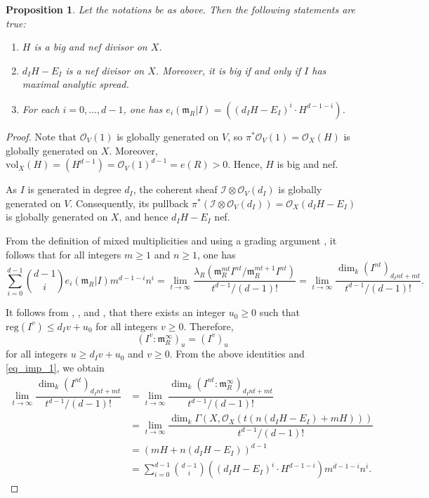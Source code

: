 \documentclass[12pt,a4paper]{amsart}
\theoremstyle{plain}
\newtheorem{proposition}[theorem]{Proposition}
\theoremstyle{definition}
\numberwithin{equation}{theorem}
\begin{document}
\begin{proposition}\label{prop_intersect}
Let the notations be as above. Then the following statements are true:
\begin{enumerate}
 \item[$(i)$] $H$ is a big and nef divisor on $X$.
 \item[$(ii)$] $d_IH-E_I$ is a nef divisor on $X$. Moreover, it is big if and only if $I$ has maximal analytic spread.
 \item[$(iii)$] For each $i=0,\ldots,d-1$, one has $e_i\left(\mathfrak{m}_R \vert I\right) = \left((d_IH-E_I)^{i}\cdot H^{d-1-i}\right)$.
\end{enumerate}
\end{proposition}
\begin{proof}
Note that $\mathcal{O}_V(1)$ is globally generated on $V$, so $\pi^* \mathcal{O}_V(1) = \mathcal{O}_X(H)$ is globally generated on $X$. Moreover, $\mathrm{vol}_X(H) = (H^{d-1}) = {\mathcal{O}_V(1)}^{d-1} = e(R)>0$. Hence, $H$ is big and nef.

As $I$ is generated in degree $d_I$, the coherent sheaf $\mathcal{I}\otimes \mathcal{O}_V(d_I)$ is globally generated on $V$. Consequently, its pullback $\pi^*\left(\mathcal{I}\otimes \mathcal{O}_V(d_I)\right) = \mathcal{O}_X(d_IH-E_I)$ is globally generated on $X$, and hence $d_IH-E_I$ nef.

From the definition of mixed multiplicities and using a grading argument \cite[Lemma 5.2]{DDRV25}, it follows that for all integers $m\geq 1$ and $n\geq 1$, one has $$\sum_{i=0}^{d-1}\binom{d-1}{i} e_i(\mathfrak{m}_R\vert I) m^{d-1-i}n^i = \lim_{t\to\infty}\dfrac{\lambda_R\left(\mathfrak{m}_R^{mt}I^{nt}/\mathfrak{m}_R^{mt+1}I^{nt}\right)}{t^{d-1}/(d-1)!} = \lim_{t\to\infty}\dfrac{\dim_k \left(I^{nt}\right)_{d_Int+mt}}{t^{d-1}/(d-1)!}.$$

It follows from \cite{CHT99}, \cite{Kod00}, and \cite{TW05}, that there exists an integer $u_0\geq 0$ such that $\mathrm{reg}(I^v) \leq d_Iv+u_0$ for all integers $v\geq 0$. Therefore, $${\left(I^v : \mathfrak{m}_R^{\infty}\right)}_u = {\left(I^v\right)}_u$$ for all integers $u\geq d_Iv+u_0$ and $v\geq 0$. From the above identities and \eqref{eq_imp_1}, we obtain
\begin{align*}
 \lim_{t\to\infty}\dfrac{\dim_k \left(I^{nt}\right)_{d_Int+mt}}{t^{d-1}/(d-1)!} &= \lim_{t\to\infty}\dfrac{\dim_k \left(I^{nt} : \mathfrak{m}_R^{\infty}\right)_{d_Int+mt}}{t^{d-1}/(d-1)!}\\
 &= \lim_{t\to\infty}\dfrac{\dim_k\Gamma\left(X,\mathcal{O}_X\left(t\left(n(d_IH-E_I) + mH\right)\right)\right)}{t^{d-1}/(d-1)!}\\
 &= \left(mH+n(d_IH-E_I)\right)^{d-1}\\
 &= \sum_{i=0}^{d-1}\binom{d-1}{i} \left((d_IH-E_I)^i\cdot H^{d-1-i}\right)m^{d-1-i}n^i.
\end{align*}


\end{proof}
\end{document}
